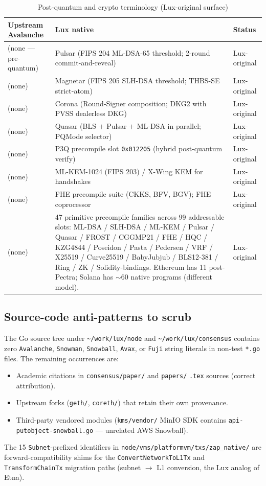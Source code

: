 \begin{table}[h]
\centering
\small
\caption{Post-quantum and crypto terminology (Lux-original surface)}
\label{tab:trans-pq}
\begin{tabular}{p{4.3cm} p{6.5cm} p{2.5cm}}
\toprule
\textbf{Upstream Avalanche} & \textbf{Lux native} & \textbf{Status} \\
\midrule
(none --- pre-quantum)
  & Pulsar (FIPS 204 ML-DSA-65 threshold; 2-round commit-and-reveal)
  & Lux-original \\
(none)
  & Magnetar (FIPS 205 SLH-DSA threshold; THBS-SE strict-atom)
  & Lux-original \\
(none)
  & Corona (Round-Signer composition; DKG2 with PVSS dealerless DKG)
  & Lux-original \\
(none)
  & Quasar (BLS $+$ Pulsar $+$ ML-DSA in parallel; PQMode selector)
  & Lux-original \\
(none)
  & P3Q precompile slot \texttt{0x012205} (hybrid post-quantum verify)
  & Lux-original \\
(none)
  & ML-KEM-1024 (FIPS 203) / X-Wing KEM for handshakes
  & Lux-original \\
(none)
  & FHE precompile suite (CKKS, BFV, BGV); FHE coprocessor
  & Lux-original \\
(none)
  & 47 primitive precompile families across 99 addressable slots:
    ML-DSA / SLH-DSA / ML-KEM / Pulsar / Quasar / FROST / CGGMP21 /
    FHE / HQC / KZG4844 / Poseidon / Pasta / Pedersen / VRF / X25519 /
    Curve25519 / BabyJubjub / BLS12-381 / Ring / ZK /
    Solidity-bindings. Ethereum has 11 post-Pectra; Solana has
    $\sim$60 native programs (different model).
  & Lux-original \\
\bottomrule
\end{tabular}
\end{table}

\subsection{Source-code anti-patterns to scrub}

The Go source tree under \texttt{\textasciitilde/work/lux/node} and
\texttt{\textasciitilde/work/lux/consensus} contains zero \texttt{Avalanche},
\texttt{Snowman}, \texttt{Snowball}, \texttt{Avax}, or \texttt{Fuji} string
literals in non-test \texttt{*.go} files. The remaining occurrences are:

\begin{itemize}[leftmargin=1.4em,topsep=0.2em,itemsep=0.1em]
  \item Academic citations in \texttt{consensus/paper/} and
        \texttt{papers/} \texttt{.tex} sources (correct attribution).
  \item Upstream forks (\texttt{geth/}, \texttt{coreth/}) that retain
        their own provenance.
  \item Third-party vendored modules (\texttt{kms/vendor/} MinIO SDK
        contains \texttt{api-putobject-snowball.go} --- unrelated AWS
        Snowball).
\end{itemize}

The 15 \texttt{Subnet}-prefixed identifiers in
\texttt{node/vms/platformvm/txs/zap\_native/} are forward-compatibility
shims for the \texttt{ConvertNetworkToL1Tx} and \texttt{TransformChainTx}
migration paths (subnet $\to$ L1 conversion, the Lux analog of Etna).
